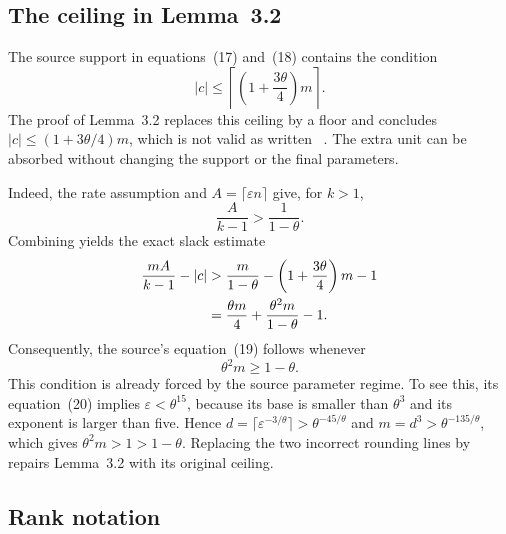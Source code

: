 \documentclass[11pt,letterpaper]{article}
\theoremstyle{definition}
\begin{document}
\subsection{The ceiling in Lemma~3.2}

The source support in equations~(17) and~(18) contains the condition
\begin{equation}
  |c|\leq
  \left\lceil\left(1+\frac{3\theta}{4}\right)m\right\rceil.
  \label{eq:source-ceiling-cap}
\end{equation}
The proof of Lemma~3.2 replaces this ceiling by a floor and concludes
\(|c|\leq(1+3\theta/4)m\), which is not valid as written
~\cite[Section 3.1, equations (17)--(19)]{BCPZZ26}.  The extra unit can be
absorbed without changing the support or the final parameters.

Indeed, the rate assumption and \(A=\lceil\varepsilon n\rceil\) give, for
\(k>1\),
\begin{equation}
  \frac{A}{k-1}>\frac{1}{1-\theta}.
  \label{eq:source-strong-agreement-ratio}
\end{equation}
Combining  yields
the exact slack estimate
\begin{align}
  \frac{mA}{k-1}-|c|
  &>
  \frac{m}{1-\theta}
  -\left(1+\frac{3\theta}{4}\right)m-1 \notag\\
  &=
  \frac{\theta m}{4}
  +\frac{\theta^2m}{1-\theta}-1.
  \label{eq:source-ceiling-repair}
\end{align}
Consequently, the source's equation~(19) follows whenever
\begin{equation}
  \theta^2m\geq1-\theta.
  \label{eq:source-rounding-sufficient-condition}
\end{equation}
This condition is already forced by the source parameter regime.  To see
this, its equation~(20) implies \(\varepsilon<\theta^{15}\), because its base
is smaller than \(\theta^3\) and its exponent is larger than five.  Hence
\(d=\lceil\varepsilon^{-3/\theta}\rceil>
\theta^{-45/\theta}\) and
\(m=d^3>\theta^{-135/\theta}\), which gives
\(\theta^2m>1>1-\theta\).  Replacing the two incorrect rounding lines by
 repairs Lemma~3.2 with its original ceiling.

\subsection{Rank notation}
\end{document}
